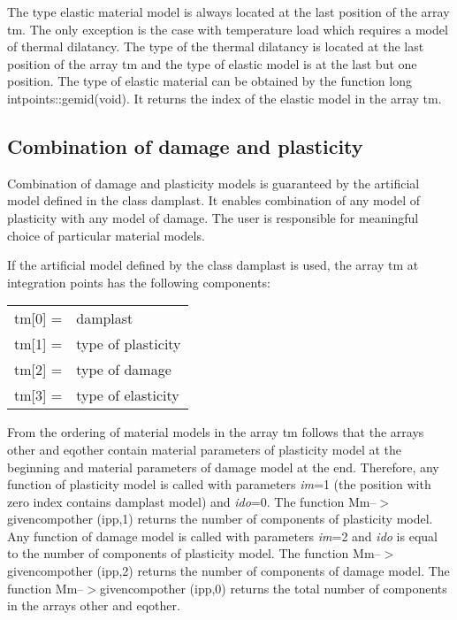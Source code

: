 The type elastic material model is always located at the last position of the array {\sf tm}. The only exception
is the case with temperature load which requires a model of thermal dilatancy. The type of the thermal dilatancy
is located at the last position of the array {\sf tm} and the type of elastic model is at the last but one position.
The type of elastic material can be obtained by the function {\sf long intpoints::gemid(void)}. It returns
the index of the elastic model in the array {\sf tm}.

\subsection{Combination of damage and plasticity}

Combination of damage and plasticity models is guaranteed by the artificial model defined in the class {\sf damplast}.
It enables combination of any model of plasticity with any model of damage. The user is responsible for
meaningful choice of particular material models.

If the artificial model defined by the class {\sf damplast} is used, the array {\sf tm}
at integration points has the following components:

\begin{center}
\begin{tabular}{cl}
tm[0] =& damplast\\
tm[1] =& type of plasticity\\
tm[2] =& type of damage\\
tm[3] =& type of elasticity\\
\end{tabular}
\end{center}

From the ordering of material models in the array {\sf tm} follows that the arrays {\sf other}
and {\sf eqother} contain material parameters of plasticity model at the beginning and
material parameters of damage model at the end. Therefore, any function of plasticity model
is called with parameters {\it im}=1 (the position with zero index contains damplast model) and {\it ido}=0.
The function {\sf Mm--$>$givencompother (ipp,1)} returns the number of components of plasticity model.
Any function of damage model is called with parameters {\it im}=2 and {\it ido} is equal to the
number of components of plasticity model.
The function {\sf Mm--$>$givencompother (ipp,2)} returns the number of components of damage model.
The function {\sf Mm--$>$givencompother (ipp,0)} returns the total number of components in the arrays
{\sf other} and {\sf eqother}.

